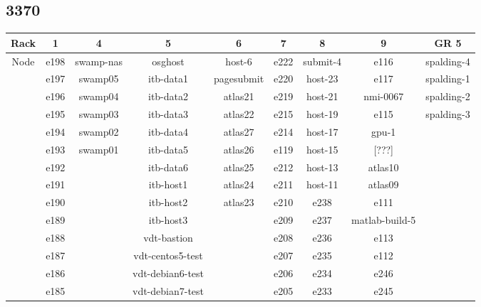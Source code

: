\documentclass[10pt,letterpaper]{article}
\begin{document}
    \subsection{3370}
        \begin{center}
        \begin{tabular}{ |c|c|c|c|c|c|c|c|c| }
        \hline
        Rack & 1 & 4 & 5 & 6 & 7 & 8 & 9 & GR 5 \\
        \hline
        \multirow{1}{3em}{Node}

        & e198 & swamp-nas & osghost        & host-6     & e222    & submit-4 & e116           & spalding-4 \\
        & e197 & swamp05 & itb-data1        & pagesubmit & e220    & host-23  & e117           & spalding-1 \\
        & e196 & swamp04 & itb-data2        & atlas21    & e219    & host-21  & nmi-0067       & spalding-2 \\
        & e195 & swamp03 & itb-data3        & atlas22    & e215    & host-19  & e115           & spalding-3 \\
        & e194 & swamp02 & itb-data4        & atlas27    & e214    & host-17  & gpu-1          &            \\
        & e193 & swamp01 & itb-data5        & atlas26    & e119    & host-15  & [???]          &            \\
        & e192 &         & itb-data6        & atlas25    & e212    & host-13  & atlas10        &            \\
        & e191 &         & itb-host1        & atlas24    & e211    & host-11  & atlas09        &            \\
        & e190 &         & itb-host2        & atlas23    & e210    & e238     & e111           &            \\
        & e189 &         & itb-host3        &            & e209    & e237     & matlab-build-5 &            \\
        & e188 &         & vdt-bastion      &            & e208    & e236     & e113           &            \\
        & e187 &         & vdt-centos5-test &            & e207    & e235     & e112           &            \\
        & e186 &         & vdt-debian6-test &            & e206    & e234     & e246           &            \\
        & e185 &         & vdt-debian7-test &            & e205    & e233     & e245           &            \\

\end{tabular}
\end{center}
\end{document}
